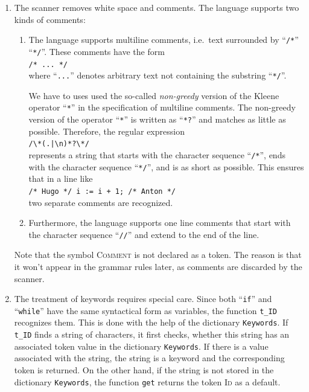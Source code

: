 \begin{enumerate}
\item The scanner removes white space and comments.  The language supports two kinds of comments:
      \begin{enumerate}
      \item The language supports multiline comments, i.e.~text surrounded by ``\texttt{/*}'' ``\texttt{*/}''.
            These comments have the form
            \\[0.2cm]
            \hspace*{1.3cm}
            \texttt{/* ... */}
            \\[0.2cm]
            where ``\texttt{...}'' denotes arbitrary text not containing the substring ``\texttt{*/}''.

            We have to uses used the so-called \emph{non-greedy} version of the
            Kleene operator ``\texttt{*}'' in the specification of multiline comments. The non-greedy version of the
            operator ``\texttt{*}'' is written as ``\texttt{*?}'' and matches as little as possible. Therefore, the
            regular expression 
            \\[0.2cm]
            \hspace*{1.3cm}
            \verb$/\*(.|\n)*?\*/$ %
            \\[0.2cm]
            represents a string that starts with the character sequence ``\texttt{/*}'', ends with the
            character sequence ``\texttt{*/}'', and is as short as possible. This ensures that in a line like
            \\[0.2cm]
            \hspace*{1.3cm}
            \texttt{/* Hugo */ i := i + 1; /* Anton */}
            \\[0.2cm]
            two separate comments are recognized.
      \item Furthermore, the language supports one line comments that start with the character sequence ``\texttt{//}''
            and extend to the end of the line.
      \end{enumerate}
      Note that the symbol \textsc{Comment} is not declared as a token.  The reason is that it won't appear in the grammar
      rules later, as comments are discarded by the scanner.
\item The treatment of keywords requires special care.  Since both ``\texttt{if}'' and ``\texttt{while}'' have
      the same syntactical form as variables, the function \texttt{t\_ID} recognizes them.  This is done with
      the help of the dictionary \texttt{Keywords}.  If \texttt{t\_ID} finds a string of characters, it first
      checks, whether this string has an associated token value in the dictionary \texttt{Keywords}.  If there
      is a value associated with the string, the string is a keyword and the corresponding token is returned.
      On the other hand, if the string is not stored in the dictionary \texttt{Keywords}, the function
      \texttt{get} returns the token \textsc{Id} as a default. 
\end{enumerate}


